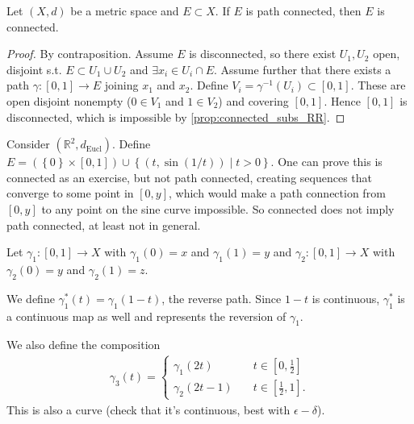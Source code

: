 \begin{prop}\label{prop:path_conn_conn}
	Let $(X,d)$ be a metric space and $E \subset X$. If $E$ is path connected, then $E$ is connected.
\end{prop}
\begin{proof}
	By contraposition. Assume $E$ is disconnected, so there exist $U_{1}, U_{2}$ open, disjoint s.t. $E \subset U_{1} \cup U_{2}$ and $\exists x_{i} \in U_{i} \cap E$.
	Assume further that there exists a path $\gamma: [0,1] \to E$ joining $x_{1}$ and $x_{2}$. Define $V_{i} = \gamma^{-1}(U_{i}) \subset [0,1]$. These are open disjoint nonempty ($0 \in V_{1}$ and $1 \in V_{2}$) and covering $[0,1]$. Hence $[0,1]$ is disconnected, which is impossible by \ref{prop:connected_subs_RR}.
\end{proof}

\begin{eg}
	Consider $(\mathbb{R}^{2}, d_{\text{Eucl}})$. Define $E = (\left\{ 0 \right\} \times [0,1]) \cup \left\{ (t, \sin(1 / t)) \mid t > 0 \right\}$. One can prove this is connected as an exercise, but not path connected, creating sequences that converge to some point in $[0,y]$, which would make a path connection from $[0,y]$ to any point on the sine curve impossible. So connected does not imply path connected, at least not in general.
\end{eg}

\begin{definition}\label{def:composed_path}
	Let $\gamma_{1}:[0,1] \to X$ with $\gamma_{1} (0) = x$ and $\gamma_{1} (1) = y$ and $\gamma_{2}: [0,1] \to X$ with $\gamma_{2}(0) = y$ and $\gamma_{2}(1) = z$.

	We define $\gamma_{1}^*(t) = \gamma_{1}(1-t)$, the reverse path. Since $1-t$ is continuous, $\gamma_{1}^*$ is a continuous map as well and represents the reversion of $\gamma_{1}$.

	We also define the composition
	\begin{align*}
		\gamma_{3}(t) =
		\begin{cases}
			\gamma_{1}(2t) \quad     & t \in \left[0,\tfrac{1}{2}\right]  \\
			\gamma_{2}(2t - 1) \quad & t \in \left[\tfrac{1}{2},1\right].
		\end{cases}
	\end{align*}
	This is also a curve (check that it's continuous, best with $\epsilon-\delta$).
\end{definition}

